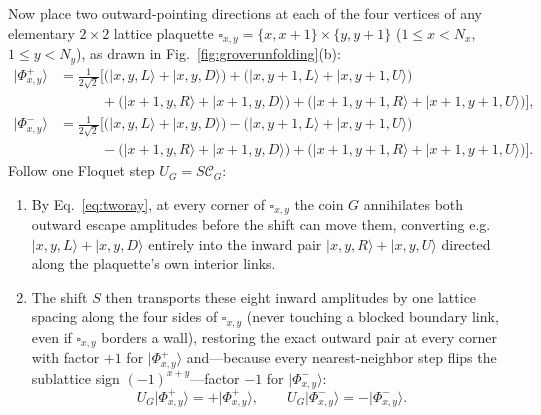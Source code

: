 \documentclass[11pt,a4paper,oneside]{report}
\newcommand{\ket}[1]{\lvert #1\rangle}
\newcommand{\CC}{\mathcal C}
\numberwithin{equation}{chapter}
\begin{document}
Now place two outward-pointing directions at each of the four vertices of any
elementary \(2\times2\) lattice plaquette
\(\square_{x,y}=\{x,x+1\}\times\{y,y+1\}\) (\(1\le x<N_x\), \(1\le y<N_y\)),
as drawn in Fig.~\ref{fig:groverunfolding}(b):
\begin{align}
\ket{\Phi^+_{x,y}}&=\frac1{2\sqrt2}\Big[
\big(\ket{x,y,L}+\ket{x,y,D}\big)
+\big(\ket{x,y+1,L}+\ket{x,y+1,U}\big)\nonumber\\
&\qquad\quad+\big(\ket{x+1,y,R}+\ket{x+1,y,D}\big)
+\big(\ket{x+1,y+1,R}+\ket{x+1,y+1,U}\big)\Big],\\
\ket{\Phi^-_{x,y}}&=\frac1{2\sqrt2}\Big[
\big(\ket{x,y,L}+\ket{x,y,D}\big)
-\big(\ket{x,y+1,L}+\ket{x,y+1,U}\big)\nonumber\\
&\qquad\quad-\big(\ket{x+1,y,R}+\ket{x+1,y,D}\big)
+\big(\ket{x+1,y+1,R}+\ket{x+1,y+1,U}\big)\Big].
\end{align}
Follow one Floquet step \(U_G=S\CC_G\):
\begin{enumerate}
\item By Eq.~\eqref{eq:tworay}, at every corner of \(\square_{x,y}\) the
coin \(G\) annihilates both outward escape amplitudes before the shift can
move them, converting e.g.\ \(\ket{x,y,L}+\ket{x,y,D}\) entirely into the
inward pair \(\ket{x,y,R}+\ket{x,y,U}\) directed along the plaquette's own
interior links.
\item The shift \(S\) then transports these eight inward amplitudes by one
lattice spacing along the four sides of \(\square_{x,y}\) (never touching a
blocked boundary link, even if \(\square_{x,y}\) borders a wall), restoring
the exact outward pair at every corner with factor \(+1\) for
\(\ket{\Phi^+_{x,y}}\) and---because every nearest-neighbor step flips the
sublattice sign \((-1)^{x+y}\)---factor \(-1\) for \(\ket{\Phi^-_{x,y}}\):
\begin{equation}
U_G\ket{\Phi^+_{x,y}}=+\ket{\Phi^+_{x,y}},\qquad
U_G\ket{\Phi^-_{x,y}}=-\ket{\Phi^-_{x,y}}.
\end{equation}
\end{enumerate}
\end{document}
